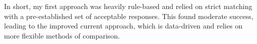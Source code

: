 In short, my first approach was heavily rule-based and relied on strict matching with a pre-established set of acceptable responses. This found moderate success, leading to the improved current approach, which is data-driven and relies on more flexible methods of comparison.
%
%
%
%
